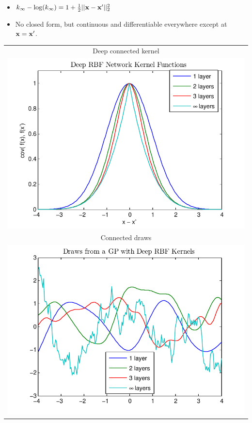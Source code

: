 \documentclass[portrait,a0b,final,a4resizeable]{include/a0poster}
\begin{document}
\begin{poster}
\begin{multicols}{2}
\begin{minipage}[c]{0.5\columnwidth}
\begin{itemize}
\item %
$k_\infty - \log(k_\infty) = 1 + \frac{1}{2} || \mathbf{x} - \mathbf{x}' ||_2^2$
\item No closed form, but continuous and differentiable everywhere except at $\mathbf{x} = \mathbf{x}'$.
\end{itemize}
\end{minipage}
\begin{minipage}[c]{0.39\columnwidth}
\begin{centering}
\begin{tabular}{c}
Deep connected kernel \\
\hspace{-0.5cm}\includegraphics[width=\columnwidth, clip, trim = 0cm 0.4cm 0.9cm 0.3cm]{../figures/deep_kernel_connected} \\
Connected \gp{} draws \\
\hspace{-0.5cm}\includegraphics[width=\columnwidth, clip, trim = 0cm 0.1cm 0.9cm 0.35cm]{../figures/deep_kernel_connected_draws}

\end{tabular}
\end{centering}
\end{minipage}
\end{multicols}
\end{poster}
\end{document}
